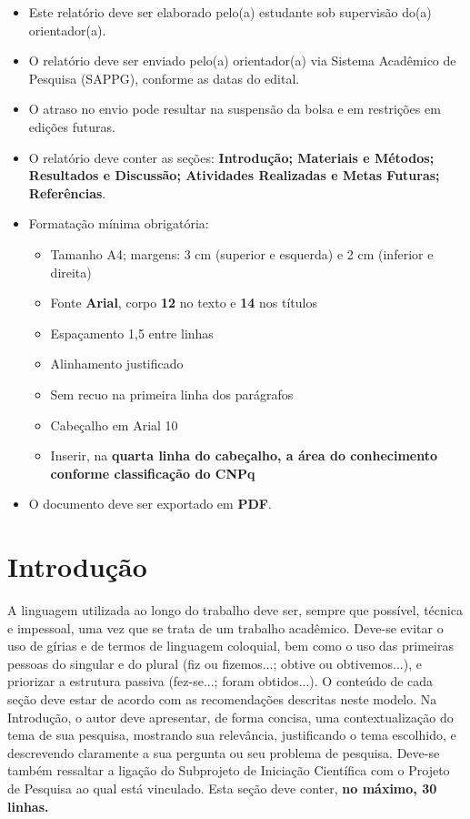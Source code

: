 \documentclass[a4paper,12pt]{article}
\begin{document}
{\color{red}

\begin{itemize}
  \item Este relatório deve ser elaborado pelo(a) estudante sob supervisão do(a) orientador(a).
  \item O relatório deve ser enviado pelo(a) orientador(a) via Sistema Acadêmico de Pesquisa (SAPPG), conforme as datas do edital.
  \item O atraso no envio pode resultar na suspensão da bolsa e em restrições em edições futuras.
  \item O relatório deve conter as seções: \textbf{Introdução; Materiais e Métodos; Resultados e Discussão; Atividades Realizadas e Metas Futuras; Referências}.
  \item Formatação mínima obrigatória:
    \begin{itemize}
      \item Tamanho A4; margens: 3 cm (superior e esquerda) e 2 cm (inferior e direita)
      \item Fonte \textbf{Arial}, corpo \textbf{12} no texto e \textbf{14} nos títulos
      \item Espaçamento 1,5 entre linhas
      \item Alinhamento justificado
      \item Sem recuo na primeira linha dos parágrafos
      \item Cabeçalho em Arial 10
      \item Inserir, na \textbf{quarta linha do cabeçalho, a área do conhecimento conforme classificação do CNPq}
    \end{itemize}
    \item O documento deve ser exportado em \textbf{PDF}.
\end{itemize}
}

\section{Introdução}
A linguagem utilizada ao longo do trabalho deve ser, sempre que possível, técnica e impessoal, uma vez que se trata de um trabalho acadêmico. Deve-se evitar o uso de gírias e de termos de linguagem coloquial, bem como o uso das primeiras pessoas do singular e do plural (fiz ou fizemos...; obtive ou obtivemos...), e priorizar a estrutura passiva (fez-se...; foram obtidos...). O conteúdo de cada seção deve estar de acordo com as recomendações descritas neste modelo. Na Introdução, o autor deve apresentar, de forma concisa, uma contextualização do tema de sua pesquisa, mostrando sua relevância, justificando o tema escolhido, e descrevendo claramente a sua pergunta ou seu problema de pesquisa. Deve-se também ressaltar a ligação do Subprojeto de Iniciação Científica com o Projeto de Pesquisa ao qual está vinculado. Esta seção deve conter, \textbf{no máximo, 30 linhas.}
\end{document}
